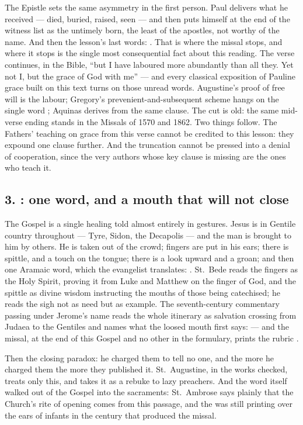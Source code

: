 The Epistle sets the same asymmetry in the first person. Paul delivers what he
received --- died, buried, raised, seen --- and then puts himself at the end of
the witness list as the untimely born, the least of the apostles, not worthy of
the name. And then the lesson's last words: . That is where the missal stops, and
where it stops is the single most consequential fact about this reading. The
verse continues, in the Bible, ``but I have laboured more abundantly than all
they. Yet not I, but the grace of God with me'' --- and every classical
exposition of Pauline grace built on this text turns on those unread words.
Augustine's proof of free will is the labour; Gregory's
prevenient-and-subsequent scheme hangs on the single word ; Aquinas derives
 from the same clause. The cut is old: the same
mid-verse ending stands in the Missals of 1570 and 1862. Two things follow.
The Fathers' teaching on grace from this verse cannot be credited to this
lesson: they expound one clause further. And the
truncation cannot be pressed into a denial of cooperation, since the very
authors whose key clause is missing are the ones who teach it.

\subsection*{3. : one word, and a mouth that will not close}

The Gospel is a single healing told almost entirely in gestures. Jesus is in
Gentile country throughout --- Tyre, Sidon, the Decapolis --- and the man is
brought to him by others. He is taken out of the crowd; fingers are put in his
ears; there is spittle, and a touch on the tongue; there is a look upward and a
groan; and then one Aramaic word, which the evangelist translates:
. St.~Bede reads the fingers as the Holy
Spirit, proving it from Luke and Matthew on the finger of God, and the spittle
as divine wisdom instructing the mouths of those being catechised; he reads the
sigh not as need but as example. The seventh-century commentary passing under
Jerome's name reads the whole itinerary as salvation crossing from Judaea to
the Gentiles and names what the loosed mouth first says:  --- and the missal, at the end of this Gospel and no
other in the formulary, prints the rubric .

Then the closing paradox: he charged them to tell no one, and the more he
charged them the more they published it. St.~Augustine, in the works checked, treats only this, and
takes it as a rebuke to lazy preachers. And the word itself walked out of the
Gospel into the sacraments: St.~Ambrose says plainly that the Church's rite of
opening comes from this passage, and the  was still
printing  over the ears of infants in the
century that produced the missal.

